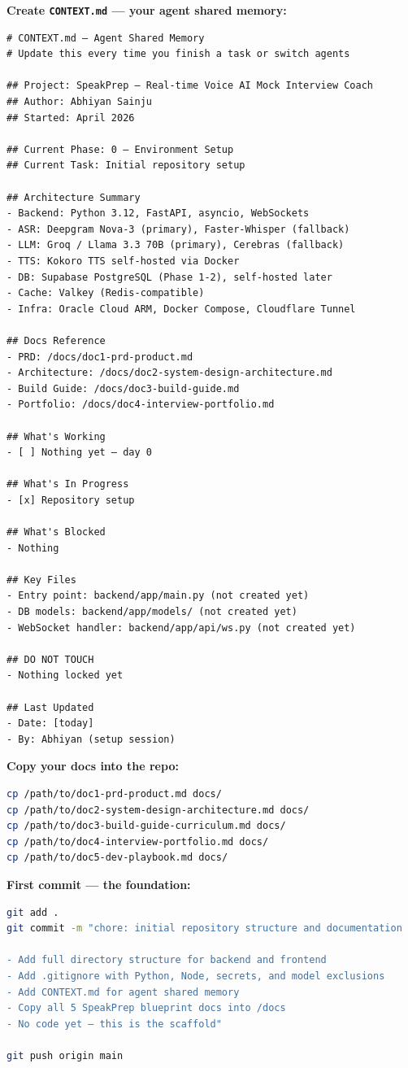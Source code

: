 \documentclass[
  11pt,
]{article}
\newcommand{\passthrough}[1]{#1}
\begin{document}
\textbf{Create \passthrough{\lstinline!CONTEXT.md!} --- your agent
shared memory:}

\begin{lstlisting}
# CONTEXT.md — Agent Shared Memory
# Update this every time you finish a task or switch agents

## Project: SpeakPrep — Real-time Voice AI Mock Interview Coach
## Author: Abhiyan Sainju
## Started: April 2026

## Current Phase: 0 — Environment Setup
## Current Task: Initial repository setup

## Architecture Summary
- Backend: Python 3.12, FastAPI, asyncio, WebSockets
- ASR: Deepgram Nova-3 (primary), Faster-Whisper (fallback)
- LLM: Groq / Llama 3.3 70B (primary), Cerebras (fallback)
- TTS: Kokoro TTS self-hosted via Docker
- DB: Supabase PostgreSQL (Phase 1-2), self-hosted later
- Cache: Valkey (Redis-compatible)
- Infra: Oracle Cloud ARM, Docker Compose, Cloudflare Tunnel

## Docs Reference
- PRD: /docs/doc1-prd-product.md
- Architecture: /docs/doc2-system-design-architecture.md
- Build Guide: /docs/doc3-build-guide.md
- Portfolio: /docs/doc4-interview-portfolio.md

## What's Working
- [ ] Nothing yet — day 0

## What's In Progress
- [x] Repository setup

## What's Blocked
- Nothing

## Key Files
- Entry point: backend/app/main.py (not created yet)
- DB models: backend/app/models/ (not created yet)
- WebSocket handler: backend/app/api/ws.py (not created yet)

## DO NOT TOUCH
- Nothing locked yet

## Last Updated
- Date: [today]
- By: Abhiyan (setup session)
\end{lstlisting}

\textbf{Copy your docs into the repo:}

\begin{lstlisting}[language=bash]
cp /path/to/doc1-prd-product.md docs/
cp /path/to/doc2-system-design-architecture.md docs/
cp /path/to/doc3-build-guide-curriculum.md docs/
cp /path/to/doc4-interview-portfolio.md docs/
cp /path/to/doc5-dev-playbook.md docs/
\end{lstlisting}

\textbf{First commit --- the foundation:}

\begin{lstlisting}[language=bash]
git add .
git commit -m "chore: initial repository structure and documentation

- Add full directory structure for backend and frontend
- Add .gitignore with Python, Node, secrets, and model exclusions
- Add CONTEXT.md for agent shared memory
- Copy all 5 SpeakPrep blueprint docs into /docs
- No code yet — this is the scaffold"

git push origin main
\end{lstlisting}
\end{document}
